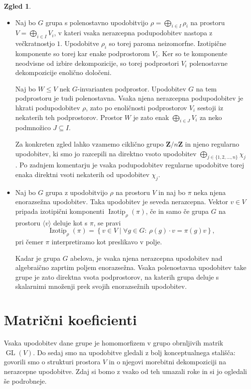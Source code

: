 \documentclass[11pt]{book}
\def\ZZ{\mathbf{Z}}
\DeclareMathOperator\Izotip{Izotip}
\DeclareMathOperator\GL{GL}
\theoremstyle{definition}
\theoremstyle{zgled}
\newtheorem{zgled}[theorem]{Zgled}
\theoremstyle{zgledbrezstevilke}
\theoremstyle{odprtproblem}
\theoremstyle{domacanaloga}
\theoremstyle{izrek}
\begin{document}
\begin{zgled} \leavevmode
\begin{itemize}
\item Naj bo $G$ grupa s polenostavno upodobitvijo $\rho = \bigoplus_{i \in I} \rho_i$ na prostoru $V = \bigoplus_{i \in I} V_i$, v kateri vsaka nerazcepna podupodobitev nastopa z večkratnostjo $1$. Upodobitve $\rho_i$ so torej paroma neizomorfne. Izotipične komponente so torej kar enake podprostorom $V_i$. Ker so te komponente neodvisne od izbire dekompozicije, so torej podprostori $V_i$ polenostavne dekompozicije enolično določeni.

Naj bo $W \leq V$ nek $G$-invarianten podprostor. Upodobitev $G$ na tem podprostoru je tudi polenostavna. Vsaka njena nerazcepna podupodobitev je hkrati podupodobitev $\rho$, zato po enoličnosti podprostorov $V_i$ sestoji iz nekaterih teh podprostorov. Prostor $W$ je zato enak $\bigoplus_{i \in J} V_i$ za neko podmnožico $J \subseteq I$.

Za konkreten zgled lahko vzamemo ciklično grupo $\ZZ/n\ZZ$ in njeno regularno upodobitev, ki smo jo razcepili na direktno vsoto upodobitev $\bigoplus_{j \in \{ 1,2,\dots,n \}} \chi_j$. Po zadnjem komentarju je vsaka podupodobitev regularne upodobitve torej enaka direktni vsoti nekaterih od upodobitev $\chi_j$.

\item Naj bo $G$ grupa z upodobitvijo $\rho$ na prostoru $V$ in naj bo $\pi$ neka njena enorazsežna upodobitev. Taka upodobitev je seveda nerazcepna. Vektor $v \in V$ pripada izotipični komponenti $\Izotip_{\rho}(\pi)$, če in samo če grupa $G$ na prostoru $\langle v \rangle$ deluje kot s $\pi$, se pravi
\[
    \textstyle \Izotip_{\rho}(\pi) = \left\{ v \in V \mid \forall g \in G \colon \ \rho(g) \cdot v = \pi(g) v \right\},
\]
pri čemer $\pi$ interpretiramo kot preslikavo v polje.

Kadar je grupa $G$ abelova, je vsaka njena nerazcepna upodobitev nad algebraično zaprtim poljem enorazsežna. Vsaka polenostavna upodobitev take grupe je zato direktna vsota podprostorov, na katerih grupa deluje s skalarnimi množenji prek svojih enorazsežnih upodobitev.
\end{itemize}
\end{zgled}


\section{Matrični koeficienti}

Vsaka upodobitev dane grupe je homomorfizem v grupo obrnljivih matrik $\GL(V)$. Do sedaj smo na upodobitve gledali z bolj konceptualnega stališča: govorili smo o strukturi prostora $V$ in o njegovi morebitni dekompoziciji na nerazcepne upodobitve. Zdaj si bomo z vsako od teh umazali roke in si jo ogledali še podrobneje. 
\end{document}
